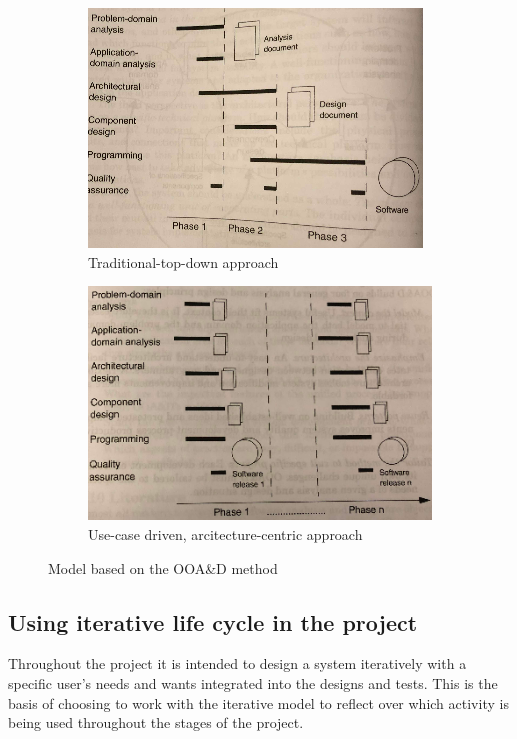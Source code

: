 \begin{figure}[H]
	\centering
	\begin{subfigure}[b]{0.48\textwidth}
		\includegraphics[width=\textwidth]{billeder/SUModel1.png}
		\caption{Traditional-top-down approach \citep[p.~16]{Rod-Aalborg}}
		\label{fig:SUModel1}
	\end{subfigure}
	\quad
	\begin{subfigure}[b]{0.48\textwidth}
		\includegraphics[width=\textwidth]{billeder/SUModel2.png}
		\caption{Use-case driven, arcitecture-centric approach \citep[p.~17]{Rod-Aalborg}}
		\label{fig:SUModel2}
	\end{subfigure}
	\caption{Model based on the OOA\&D method}\label{fig:SUModels}
\end{figure}


\subsection{Using iterative life cycle in the project}
Throughout the project it is intended to design a system iteratively with a specific user’s needs and wants integrated into the designs and tests. This is the basis of choosing to work with the iterative model to reflect over which activity is being used throughout the stages of the project.